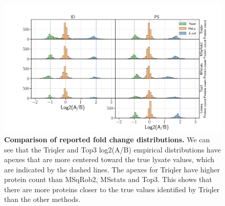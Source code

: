 \documentclass[11pt]{article}
\begin{document}
\begin{figure}[hbt]
    \centering
    \setlength{\tabcolsep}{0pt}

    \includegraphics[width=\linewidth]{../../result/report_plots/gridplot_histogram.png} 


    \caption{{\bf Comparison of reported fold change distributions.} We can see that the Triqler and Top3 log2(A/B) empirical distributions have apexes that are more centered toward the true lysate values, which are indicated by the dashed lines. The apexes for Triqler have higher protein count than MSqRob2, MSstats and Top3. This shows that there are more proteins closer to the true values identified by Triqler than the other methods. \label{fig:fc_histogram_supplement}}
    
\end{figure}
\end{document}
